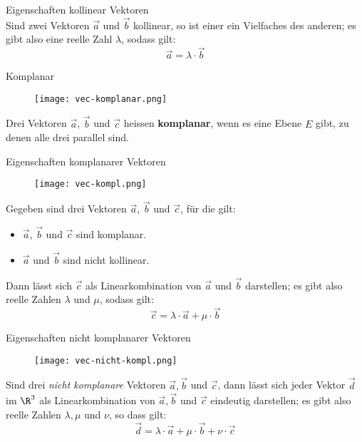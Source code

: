 \begin{theorem}{Eigenschaften kollinear Vektoren}\\
    Sind zwei Vektoren $\vec{a}$ und $\vec{b}$ kollinear, so ist einer ein Vielfaches des anderen; 
    es gibt also eine reelle Zahl $\lambda$, sodass gilt: 
    \begin{equation*}
        \vec{a}=\lambda\cdot\vec{b}
    \end{equation*}
\end{theorem}

\begin{definition}{Komplanar}
    \begin{wrapfigure}{r}{0.2\textwidth}
        \vspace{-10pt}
        \texttt{[image: vec-komplanar.png]}
    \end{wrapfigure}
    Drei Vektoren $\vec{a}$, $\vec{b}$ und $\vec{c}$ heissen \textbf{komplanar}, 
    wenn es eine Ebene $E$ gibt, zu denen alle drei parallel sind.
    \vspace{5pt}
\end{definition}

\begin{theorem}{Eigenschaften komplanarer Vektoren}\\
    \begin{wrapfigure}{r}{0.2\textwidth}
        \vspace{-10pt}
        \texttt{[image: vec-kompl.png]}
    \end{wrapfigure}
    Gegeben sind drei Vektoren $\vec{a}$, $\vec{b}$ und $\vec{c}$, für die gilt:
    \begin{itemize}
        \item $\vec{a}$, $\vec{b}$ und $\vec{c}$ sind komplanar.
        \item $\vec{a}$ und $\vec{b}$ sind nicht kollinear.
    \end{itemize} 
    Dann lässt sich $\vec{c}$ als Linearkombination von $\vec{a}$ und $\vec{b}$ darstellen; 
    es gibt also reelle Zahlen $\lambda$ und $\mu$, sodass gilt:
    \begin{equation*}
        \vec{c}=\lambda\cdot\vec{a}+\mu\cdot\vec{b}
    \end{equation*}
\end{theorem}

\begin{theorem}{Eigenschaften nicht komplanarer Vektoren}\\
    \begin{wrapfigure}{r}{0.2\textwidth}
        \vspace{-10pt}
        \texttt{[image: vec-nicht-kompl.png]}
    \end{wrapfigure}
    Sind drei \textit{nicht komplanare} Vektoren $\vec{a}, \vec{b}$ und $\vec{c}$,
    dann lässt sich jeder Vektor $\vec{d}$ im $\R^3$ als Linearkombination von $\vec{a},\vec{b}$ und $\vec{c}$
    eindeutig darstellen;
    es gibt also reelle Zahlen $\lambda, \mu$ und $\nu$, so dass gilt:
    \begin{equation*}
        \vec{d}=\lambda\cdot\vec{a}+\mu\cdot\vec{b}+\nu\cdot\vec{c}
    \end{equation*}
\end{theorem}

